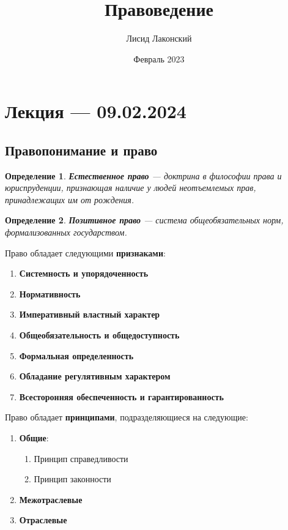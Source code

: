 \documentclass{article}
\title{Правоведение}
\author{Лисид Лаконский}
\date{Февраль 2023}
\newtheorem{definition}{Определение}
\begin{document}
\raggedright

\maketitle

\tableofcontents
\pagebreak

\section{Лекция — 09.02.2024}

\subsection{Правопонимание и право}

\begin{definition}
    \textbf{Естественное право} — доктрина в философии права и юриспруденции, признающая наличие у людей неотъемлемых прав, принадлежащих им от рождения.
\end{definition}

\begin{definition}
    \textbf{Позитивное право} — система общеобязательных норм, формализованных государством.
\end{definition}

Право обладает следующими \textbf{признаками}:

\begin{enumerate}
    \item \textbf{Системность и упорядоченность}
    \item \textbf{Нормативность}
    \item \textbf{Императивный властный характер}
    \item \textbf{Общеобязательность и общедоступность}
    \item \textbf{Формальная определенность}
    \item \textbf{Обладание регулятивным характером}
    \item \textbf{Всесторонняя обеспеченность и гарантированность}
\end{enumerate}

Право обладает \textbf{принципами}, подразделяющиеся на следующие:

\begin{enumerate}
    \item \textbf{Общие}:
    \begin{enumerate}
        \item Принцип справедливости
        \item Принцип законности
    \end{enumerate}
    \item \textbf{Межотраслевые}
    \item \textbf{Отраслевые}
\end{enumerate}
\end{document}
